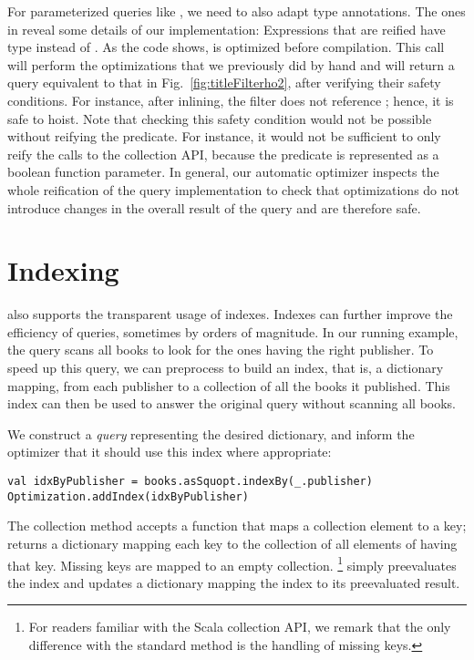 For parameterized queries like , we need to also adapt type annotations.
The ones in  reveal some details of our implementation:
Expressions that are reified have type  instead of .
As the code shows,  is optimized before compilation. This call will perform the optimizations that we previously did by hand
and will return a query equivalent to that in Fig.~\ref{fig:titleFilterho2}, after verifying their safety conditions. For instance, 
after inlining, the filter  does not reference ; hence, it is safe to hoist. 
Note that checking this safety condition would not be possible without reifying the predicate. For instance, it would
not be sufficient to only reify the calls to the collection API, because the predicate is represented as a boolean function parameter.
In general, our automatic optimizer inspects the whole reification of the query implementation to check that optimizations
do not introduce changes in the overall result of the query and are therefore safe.

\section{Indexing}

{\LoS} also supports the transparent usage of indexes. Indexes can further improve the efficiency of queries, sometimes by orders of magnitude. 
In our running example, the query scans all books to look for the ones having the right publisher. To speed up this query, we can preprocess  to build an index, that is, a dictionary mapping, from each publisher to a collection of all the books it published. This index can then be used to answer the original query without scanning all books.

We construct a \emph{query} representing the desired dictionary, and inform the optimizer that it should use this index where appropriate:
\begin{lstlisting}
val idxByPublisher = books.asSquopt.indexBy(_.publisher)
Optimization.addIndex(idxByPublisher)
\end{lstlisting}

The  collection method accepts a function that maps a collection element to a key;  returns a dictionary mapping each key to the collection of all elements of  having that key. Missing keys are mapped to an empty collection.%
\footnote{For readers familiar with the Scala collection API, we remark that the only difference with the standard  method is the handling of missing keys.}
 simply preevaluates the index and updates a dictionary mapping the index to its preevaluated result. 

